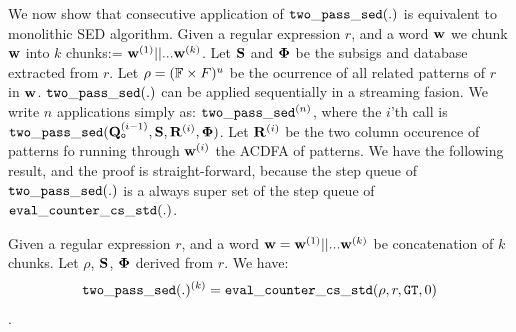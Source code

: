 We now show that consecutive application of ${\tt two\_pass\_sed(.)}$
is equivalent to monolithic SED algorithm.
Given a regular expression $r$, and a word ${{\mathbf {w}}}$ we chunk
${{\mathbf {w}}}$ into $k$ chunks:= 
${{\mathbf {w}}}^{(1)} || ... {{\mathbf {w}}}^{(k)}$.
Let ${{\mathbf {S}}}$ and ${\bf \Phi}$ be the subsigs and database extracted
from $r$.
Let $\rho = (\mathbb{F} \times F)^u$ be the
ocurrence of all related patterns of $r$ in ${{\mathbf {w}}}$. 
${\tt two\_pass\_sed(.)}$ can be applied sequentially in a streaming
fasion.  
We write $n$ applications simply as: ${\tt two\_pass\_sed}^{(n)}$,
where the $i$'th call is ${\tt two\_pass\_sed}({{{\mathbf {Q}}}}_{\texttt{o}}^{(i-1)}, {{\mathbf {S}}},
	{{\mathbf {R}}}^{(i)}, {\bf \Phi})$. 
Let ${{\mathbf {R}}}^{(i)}$  be the two column occurence of patterns
fo running through ${{\mathbf {w}}}^{(i)}$ the ACDFA of patterns. 
We have the following result, and the proof is straight-forward,
because the step queue of ${\tt two\_pass\_sed(.)}$
is a always 
super set of the step queue of ${\tt eval\_counter\_cs\_std}(.)$.

\begin{theorem} Given a regular expression $r$, and a word ${{\mathbf {w}}} = 
{{\mathbf {w}}}^{(1)} || ... {{\mathbf {w}}}^{(k)}$ be concatenation
of $k$ chunks. Let $\rho$, ${{\mathbf {S}}}$, ${\bf \Phi}$ derived from $r$.
We have:
\[
{\tt two\_pass\_sed}(.)^{(k)} = {\tt eval\_counter\_cs\_std}(\rho,r,{\tt GT},0)
\].
\end{theorem}


